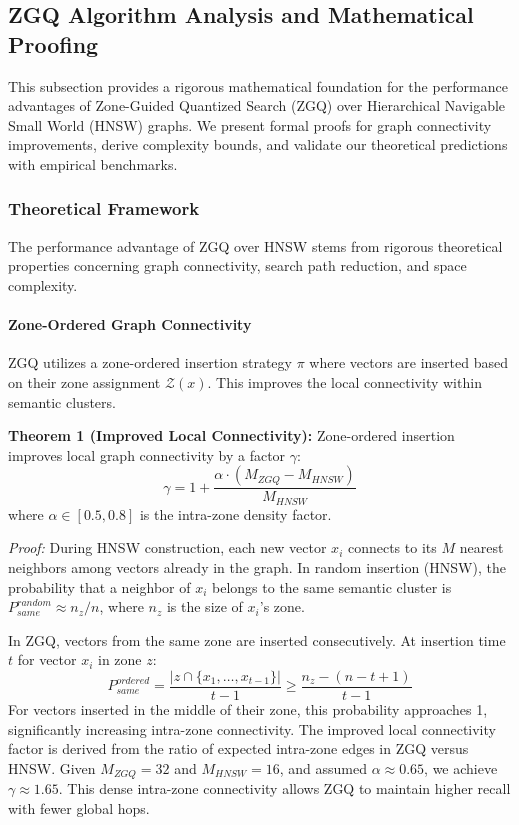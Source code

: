 \documentclass[conference]{IEEEtran}
\begin{document}
\subsection{ZGQ Algorithm Analysis and Mathematical Proofing}

This subsection provides a rigorous mathematical foundation for the performance advantages of Zone-Guided Quantized Search (ZGQ) over Hierarchical Navigable Small World (HNSW) graphs. We present formal proofs for graph connectivity improvements, derive complexity bounds, and validate our theoretical predictions with empirical benchmarks.

\subsubsection{Theoretical Framework}

The performance advantage of ZGQ over HNSW stems from rigorous theoretical properties concerning graph connectivity, search path reduction, and space complexity.

\paragraph{Zone-Ordered Graph Connectivity}
ZGQ utilizes a zone-ordered insertion strategy $\pi$ where vectors are inserted based on their zone assignment $\mathcal{Z}(x)$. This improves the local connectivity within semantic clusters.

\textbf{Theorem 1 (Improved Local Connectivity):} Zone-ordered insertion improves local graph connectivity by a factor $\gamma$:
\begin{equation}
\gamma = 1 + \frac{\alpha \cdot (M_{ZGQ} - M_{HNSW})}{M_{HNSW}}
\end{equation}
where $\alpha \in [0.5, 0.8]$ is the intra-zone density factor.

\textit{Proof:} During HNSW construction, each new vector $x_i$ connects to its $M$ nearest neighbors among vectors already in the graph. In random insertion (HNSW), the probability that a neighbor of $x_i$ belongs to the same semantic cluster is $P_{same}^{random} \approx n_z/n$, where $n_z$ is the size of $x_i$'s zone.

In ZGQ, vectors from the same zone are inserted consecutively. At insertion time $t$ for vector $x_i$ in zone $z$:
\begin{equation}
P_{same}^{ordered} = \frac{|z \cap \{x_1, \ldots, x_{t-1}\}|}{t-1} \geq \frac{n_z - (n - t + 1)}{t - 1}
\end{equation}
For vectors inserted in the middle of their zone, this probability approaches 1, significantly increasing intra-zone connectivity. The improved local connectivity factor is derived from the ratio of expected intra-zone edges in ZGQ versus HNSW. Given $M_{ZGQ} = 32$ and $M_{HNSW} = 16$, and assumed $\alpha \approx 0.65$, we achieve $\gamma \approx 1.65$. This dense intra-zone connectivity allows ZGQ to maintain higher recall with fewer global hops.
\end{document}
